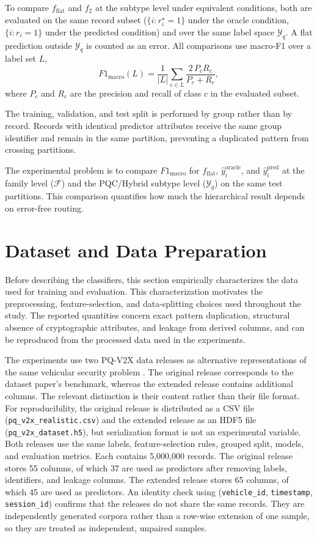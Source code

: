 \documentclass{IEEEoj}
\begin{document}
To compare $f_{\mathrm{flat}}$ and $f_2$ at the subtype level under equivalent
conditions, both are evaluated on the same record subset
($\{i : r_i^{\star}=1\}$ under the oracle condition, $\{i : r_i=1\}$ under the predicted condition)
and over the same label space $\mathcal{Y}_q$. A flat prediction outside
$\mathcal{Y}_q$ is counted as an error. All comparisons use macro-F1 over a
label set $L$,
\begin{equation}
F1_{\mathrm{macro}}(L) = \frac{1}{|L|}\sum_{c \in L}\frac{2\,P_c R_c}{P_c+R_c},
\end{equation}
where $P_c$ and $R_c$ are the precision and recall of class $c$ in the
evaluated subset.

The training, validation, and test split is performed by group rather than by
record. Records with identical predictor attributes receive the same group
identifier and remain in the same partition, preventing a duplicated pattern
from crossing partitions.

The experimental problem is to compare $F1_{\mathrm{macro}}$ for
$f_{\mathrm{flat}}$, $\hat{y}_i^{\mathrm{oracle}}$, and
$\hat{y}_i^{\mathrm{pred}}$ at the family level ($\mathcal{F}$) and the
PQC/Hybrid subtype level ($\mathcal{Y}_q$) on the same test partitions. This
comparison quantifies how much the hierarchical result depends on error-free
routing.

\section{Dataset and Data Preparation}
Before describing the classifiers, this section empirically characterizes the
data used for training and evaluation. This characterization motivates the
preprocessing, feature-selection, and data-splitting choices used throughout
the study. The reported quantities concern exact pattern duplication,
structural absence of cryptographic attributes, and leakage from derived
columns, and can be reproduced from the processed data used in the experiments.

The experiments use two PQ-V2X data releases as alternative representations of the same vehicular security problem \cite{105018710169}. The original release corresponds to the dataset paper's benchmark, whereas the extended release contains additional columns. The relevant distinction is their content rather than their file format. For reproducibility, the original release is distributed as a CSV file (\texttt{pq\_v2x\_realistic.csv}) and the extended release as an HDF5 file (\texttt{pq\_v2x\_dataset.h5}), but serialization format is not an experimental variable. Both releases use the same labels, feature-selection rules, grouped split, models, and evaluation metrics. Each contains 5,000,000 records. The original release stores 55 columns, of which 37 are used as predictors after removing labels, identifiers, and leakage columns. The extended release stores 65 columns, of which 45 are used as predictors. An identity check using (\texttt{vehicle\_id}, \texttt{timestamp}, \texttt{session\_id}) confirms that the releases do not share the same records. They are independently generated corpora rather than a row-wise extension of one sample, so they are treated as independent, unpaired samples.
\end{document}
